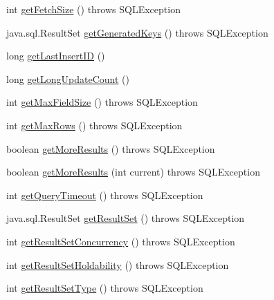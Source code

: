 \begin{DoxyCompactItemize}
\item 
int \mbox{\hyperlink{classcom_1_1mysql_1_1jdbc_1_1_statement_impl_a1f4c39edc88b50042869f5bc19828059}{get\+Fetch\+Size}} ()  throws S\+Q\+L\+Exception 
\item 
java.\+sql.\+Result\+Set \mbox{\hyperlink{classcom_1_1mysql_1_1jdbc_1_1_statement_impl_a9c52b991cceda77bcab92b5e23026c23}{get\+Generated\+Keys}} ()  throws S\+Q\+L\+Exception 
\item 
long \mbox{\hyperlink{classcom_1_1mysql_1_1jdbc_1_1_statement_impl_a0eb045b9ef9a169ee226b5c7b0dd7e05}{get\+Last\+Insert\+ID}} ()
\item 
long \mbox{\hyperlink{classcom_1_1mysql_1_1jdbc_1_1_statement_impl_a698a1458d2109c83b0e3beaec53ce933}{get\+Long\+Update\+Count}} ()
\item 
int \mbox{\hyperlink{classcom_1_1mysql_1_1jdbc_1_1_statement_impl_a066cb00e850efd48fd78d5f717fd0626}{get\+Max\+Field\+Size}} ()  throws S\+Q\+L\+Exception 
\item 
int \mbox{\hyperlink{classcom_1_1mysql_1_1jdbc_1_1_statement_impl_a5961bd894f79a6b3e2dedc7726527aab}{get\+Max\+Rows}} ()  throws S\+Q\+L\+Exception 
\item 
boolean \mbox{\hyperlink{classcom_1_1mysql_1_1jdbc_1_1_statement_impl_a49e87d562e35a0c85702f533fa1cd5df}{get\+More\+Results}} ()  throws S\+Q\+L\+Exception 
\item 
boolean \mbox{\hyperlink{classcom_1_1mysql_1_1jdbc_1_1_statement_impl_ae5d2fb5a67dcfe89312b110c52e2194d}{get\+More\+Results}} (int current)  throws S\+Q\+L\+Exception 
\item 
int \mbox{\hyperlink{classcom_1_1mysql_1_1jdbc_1_1_statement_impl_a7d917d5836a60a1e330f8c0674f551de}{get\+Query\+Timeout}} ()  throws S\+Q\+L\+Exception 
\item 
java.\+sql.\+Result\+Set \mbox{\hyperlink{classcom_1_1mysql_1_1jdbc_1_1_statement_impl_a0e97bb2074d21e45c4849e5c2b1dd0ef}{get\+Result\+Set}} ()  throws S\+Q\+L\+Exception 
\item 
int \mbox{\hyperlink{classcom_1_1mysql_1_1jdbc_1_1_statement_impl_ae2c130613ff533e0b972f7c6994363ba}{get\+Result\+Set\+Concurrency}} ()  throws S\+Q\+L\+Exception 
\item 
int \mbox{\hyperlink{classcom_1_1mysql_1_1jdbc_1_1_statement_impl_abce10c0fd6e1477f4b13f4d62e621379}{get\+Result\+Set\+Holdability}} ()  throws S\+Q\+L\+Exception 
\item 
int \mbox{\hyperlink{classcom_1_1mysql_1_1jdbc_1_1_statement_impl_ad7e587ec083198d9d53f53a131917d22}{get\+Result\+Set\+Type}} ()  throws S\+Q\+L\+Exception 

\end{DoxyCompactItemize}
